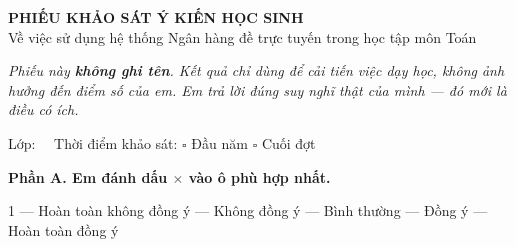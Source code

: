 \documentclass[12pt,a4paper]{article}
\begin{document}
\begin{center}
{\large\textbf{PHIẾU KHẢO SÁT Ý KIẾN HỌC SINH}}\\[2pt]
{\footnotesize Về việc sử dụng hệ thống Ngân hàng đề trực tuyến trong học tập môn Toán}
\end{center}

\vspace{4pt}
\textit{\small Phiếu này \textbf{không ghi tên}. Kết quả chỉ dùng để cải tiến
việc dạy học, không ảnh hưởng đến điểm số của em. Em trả lời đúng suy nghĩ thật
của mình --- đó mới là điều có ích.}

\vspace{6pt}
Lớp: \dotfill\ \ Thời điểm khảo sát: $\square$ Đầu năm \quad $\square$ Cuối đợt

\vspace{8pt}
\textbf{Phần A. Em đánh dấu $\times$ vào ô phù hợp nhất.}

\vspace{2pt}
{\footnotesize 1 --- Hoàn toàn không đồng ý  --- Không đồng ý  --- Bình thường  --- Đồng ý  --- Hoàn toàn đồng ý}
\end{document}
